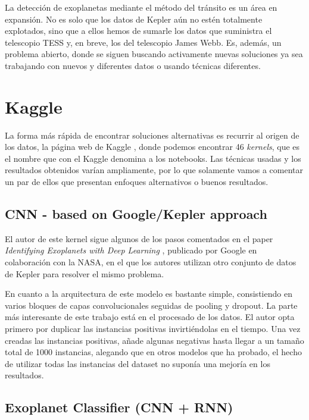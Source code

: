 
La detección de exoplanetas mediante el método del tránsito es un área en expansión. No es solo que los datos de Kepler aún no estén totalmente explotados, sino que a ellos hemos de sumarle los datos que suministra el telescopio TESS y, en breve, los del telescopio James Webb. Es, además, un problema abierto, donde se siguen buscando activamente nuevas soluciones ya sea trabajando con nuevos y diferentes datos o usando técnicas diferentes.

\section{Kaggle}

La forma más rápida de encontrar soluciones alternativas es recurrir al origen de los datos, la página web de Kaggle \cite{Kaggle-exoplanet}, donde podemos encontrar 46 \textit{kernels}, que es el nombre que con el Kaggle denomina a los notebooks. Las técnicas usadas y los resultados obtenidos varían ampliamente, por lo que solamente vamos a comentar un par de ellos que presentan enfoques alternativos o buenos resultados.

\subsection{CNN - based on Google/Kepler approach \cite{Kaggle-kernel-CNN-Google}} 

El autor de este kernel sigue algunos de los pasos comentados en el paper \textit{Identifying Exoplanets with Deep Learning} \cite{2018AJ....155...94S}, publicado por Google en colaboración con la NASA, en el que los autores utilizan otro conjunto de datos de Kepler para resolver el mismo problema.

En cuanto a la arquitectura de este modelo es bastante simple, consistiendo en varios bloques de capas convolucionales seguidas de pooling y dropout. La parte más interesante de este trabajo está en el procesado de los datos. El autor opta primero por duplicar las instancias positivas invirtiéndolas en el tiempo. Una vez creadas las instancias positivas, añade algunas negativas hasta llegar a un tamaño total de 1000 instancias, alegando que en otros modelos que ha probado, el hecho de utilizar todas las instancias del dataset no suponía una mejoría en los resultados.   

\subsection{Exoplanet Classifier (CNN + RNN) \cite{Kaggle-kernel-Exoplanet-Classifier}}


